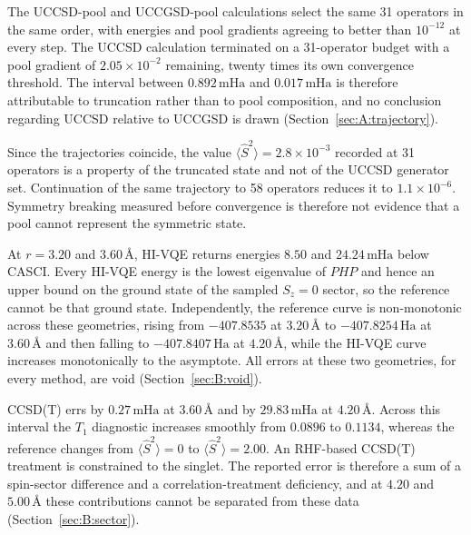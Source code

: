 \documentclass[11pt,a4paper]{article}
\newcommand{\mHa}{\ensuremath{\,\mathrm{mHa}}}
\newcommand{\Ha}{\ensuremath{\,\mathrm{Ha}}}
\newcommand{\Ang}{\ensuremath{\,\text{\AA}}}
\newcommand{\Ssq}{\ensuremath{\langle \hat{S}^2 \rangle}}
\begin{document}
\begin{result}
The UCCSD-pool and UCCGSD-pool calculations select the same 31 operators in the
same order, with energies and pool gradients agreeing to better than $10^{-12}$
at every step. The UCCSD calculation terminated on a 31-operator budget with a
pool gradient of $2.05 \times 10^{-2}$ remaining, twenty times its own
convergence threshold. The interval between $0.892\mHa$ and $0.017\mHa$ is
therefore attributable to truncation rather than to pool composition, and no
conclusion regarding UCCSD relative to UCCGSD is drawn
(Section~\ref{sec:A:trajectory}).
\end{result}

\begin{result}
Since the trajectories coincide, the value $\Ssq = 2.8 \times 10^{-3}$ recorded
at 31 operators is a property of the truncated state and not of the UCCSD
generator set. Continuation of the same trajectory to 58 operators reduces it
to $1.1 \times 10^{-6}$. Symmetry breaking measured before convergence is
therefore not evidence that a pool cannot represent the symmetric state.
\end{result}

\begin{result}
At $r = 3.20$ and $3.60\Ang$, HI-VQE returns energies $8.50$ and $24.24\mHa$
below CASCI. Every HI-VQE energy is the lowest eigenvalue of $PHP$ and hence an
upper bound on the ground state of the sampled $S_z = 0$ sector, so the
reference cannot be that ground state. Independently, the reference curve is
non-monotonic across these geometries, rising from $-407.8535$ at $3.20\Ang$ to
$-407.8254\Ha$ at $3.60\Ang$ and then falling to $-407.8407\Ha$ at $4.20\Ang$,
while the HI-VQE curve increases monotonically to the asymptote. All errors at
these two geometries, for every method, are void
(Section~\ref{sec:B:void}).
\end{result}

\begin{result}
CCSD(T) errs by $0.27\mHa$ at $3.60\Ang$ and by $29.83\mHa$ at $4.20\Ang$.
Across this interval the $T_1$ diagnostic increases smoothly from $0.0896$ to
$0.1134$, whereas the reference changes from $\Ssq = 0$ to $\Ssq = 2.00$. An
RHF-based CCSD(T) treatment is constrained to the singlet. The reported error
is therefore a sum of a spin-sector difference and a correlation-treatment
deficiency, and at $4.20$ and $5.00\Ang$ these contributions cannot be
separated from these data (Section~\ref{sec:B:sector}).
\end{result}
\end{document}
